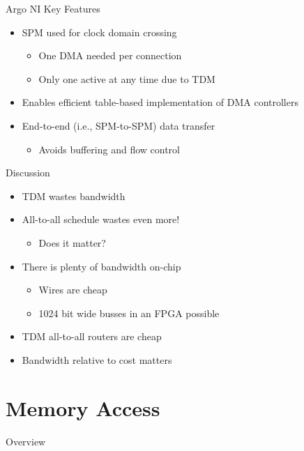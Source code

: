 \documentclass[17pt]{beamer}
\begin{document}
\begin{frame}{Argo NI Key Features}
  \begin{itemize}
  \item SPM used for clock domain crossing
    \begin{itemize}
    \item One DMA needed per connection
    \item Only one active at any time due to TDM
    \end{itemize}
  \item Enables efficient table-based implementation of DMA controllers
  \item End-to-end (i.e., SPM-to-SPM) data transfer
    \begin{itemize}
    \item Avoids buffering and flow control
    \end{itemize}
  \end{itemize}  
\end{frame}

\begin{frame}{Discussion}
  \begin{itemize}
  \item TDM wastes bandwidth
  \item All-to-all schedule wastes even more!
    \begin{itemize}
    \item Does it matter?
    \end{itemize}
  \item There is plenty of bandwidth on-chip
    \begin{itemize}
    \item Wires are cheap
    \item 1024 bit wide busses in an FPGA possible
    \end{itemize}
  \item TDM all-to-all routers are cheap
  \item Bandwidth relative to cost matters
  \end{itemize}
\end{frame}

\section{Memory Access}

\begin{frame}{Overview}
  \tableofcontents[currentsection]
\end{frame}
\end{document}
